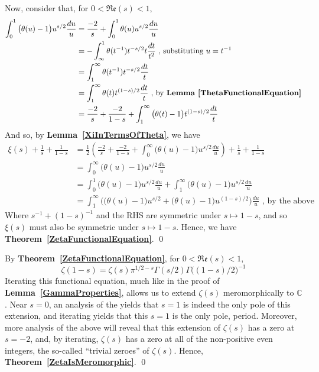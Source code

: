 \documentclass[12pt]{article}
\newcommand{\complex}{\mathbb{C}}
\newcommand{\lref}[1]{\textbf{Lemma~\ref{#1}}}
\newcommand{\tref}[1]{\textbf{Theorem~\ref{#1}}}
\numberwithin{equation}{section}
\numberwithin{thm}{section}
\numberwithin{lemma}{section}
\numberwithin{cor}{section}
\begin{document}
Now, consider that, for $0 < \mathfrak{Re}(s) < 1$, \begin{align*}
  \int_0^1 \big( \theta(u) - 1 \big)u^{s/2} \frac{du}{u} &= \frac{-2}{s} + \int_0^1 \theta(u) u^{s/2} \frac{du}{u} \\
  &= -\int_{\infty}^1 \theta(t^{-1})t^{-s/2}t \frac{dt}{t^2} \text{ , substituting } u = t^{-1} \\
  &= \int_1^{\infty} \theta(t^{-1})t^{-s/2} \frac{dt}{t} \\
  &= \int_1^{\infty} \theta(t) t^{(1 -s)/2} \frac{dt}{t} \text{ , by \lref{ThetaFunctionalEquation}} \\
  &= \frac{-2}{s} + \frac{-2}{1 - s} + \int_1^{\infty} \big( \theta(t) - 1 \big) t^{(1-s)/2} \frac{dt}{t}
\end{align*} And so, by \lref{XiInTermsOfTheta}, we have \begin{align*}
  \xi(s) + \frac{1}{s} + \frac{1}{1 - s} &= \frac{1}{2} \left( \frac{-2}{s} + \frac{-2}{1 - s} + \int_0^{\infty} \big( \theta(u) - 1 \big)u^{s/2} \frac{du}{u} \right) + \frac{1}{s} + \frac{1}{1 - s} \\
  &= \int_0^{\infty} \big( \theta(u) - 1 \big)u^{s/2} \frac{du}{u} \\
  &= \int_0^1 \big( \theta(u) - 1 \big)u^{s/2} \frac{du}{u} + \int_1^{\infty} \big( \theta(u) - 1 \big)u^{s/2} \frac{du}{u} \\
  &= \int_1^{\infty} \Big( \big( \theta(u) - 1 \big)u^{s/2} + \big( \theta(u) - 1 \big)u^{(1 -s)/2} \Big) \frac{du}{u} \text{ , by the above}
\end{align*} Where $s^{-1} + (1 - s)^{-1}$ and the RHS are symmetric under $s \mapsto 1 - s$, and so $\xi(s)$ must also be symmetric under $s \mapsto 1-s$. Hence, we have \tref{ZetaFunctionalEquation}. \qed

By \tref{ZetaFunctionalEquation}, for $0 < \mathfrak{Re}(s) < 1$, \begin{equation*}
  \zeta(1 - s) = \zeta(s) \pi^{1/2 - s} \Gamma(s/2) \Gamma \big((1 - s)/2 \big)^{-1}
\end{equation*} Iterating this functional equation, much like in the proof of \lref{GammaProperties}, allows us to extend $\zeta(s)$ meromorphically to $\complex$. Near $s = 0$, an analysis of the yields that $s = 1$ is indeed the only pole of this extension, and iterating yields that this $s = 1$ is the only pole, period. Moreover, more analysis of the above will reveal that this extension of $\zeta(s)$ has a zero at $s = -2$, and, by iterating, $\zeta(s)$ has a zero at all of the non-positive even integers, the so-called ``trivial zeroes'' of $\zeta(s)$. Hence, \tref{ZetaIsMeromorphic}. \qed
\end{document}

